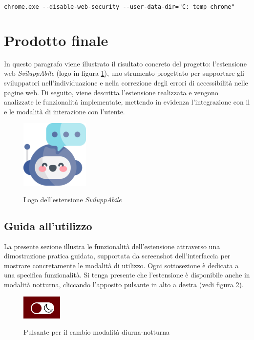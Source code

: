 \begin{verbatim}
chrome.exe --disable-web-security --user-data-dir="C:_temp_chrome"
\end{verbatim}


\section{Prodotto finale}
\noindent In questo paragrafo viene illustrato il risultato concreto del progetto: l’estensione web \textit{SviluppAbile} (logo in figura \ref{fig:logo_sviluppabile}), uno strumento progettato per supportare gli sviluppatori nell’individuazione e nella correzione degli errori di accessibilità nelle pagine web. Di seguito, viene descritta l’estensione realizzata e vengono analizzate le funzionalità implementate, mettendo in evidenza l’integrazione con il  e le modalità di interazione con l’utente.

\begin{figure}[H]
    \centering
    \includegraphics[width=0.15\linewidth, alt={Logo dell'estensione \textit{SviluppAbile}}]{img/sviluppabile.png}
    \caption{Logo dell'estensione \textit{SviluppAbile}}\label{fig:logo_sviluppabile}
\end{figure}

\subsection{Guida all'utilizzo}
\noindent La presente sezione illustra le funzionalità dell’estensione attraverso una dimostrazione pratica guidata, supportata da screenshot dell’interfaccia per mostrare concretamente le modalità di utilizzo. Ogni sottosezione è dedicata a una specifica funzionalità. Si tenga presente che l'estensione è disponibile anche in modalità notturna, cliccando l'apposito pulsante in alto a destra (vedi figura \ref{fig:notte}).
\begin{figure}[H]
    \centering
    \includegraphics[width=0.1\linewidth, alt={Pulsante per il cambio modalità diurna-notturna}]{img/toggletheme.png}
    \caption{Pulsante per il cambio modalità diurna-notturna}\label{fig:notte}
\end{figure}


